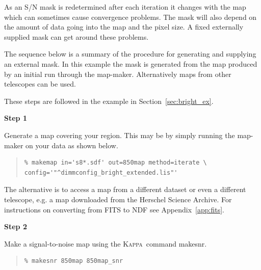 \documentclass[twoside,11pt]{article}
\newcommand{\htmlref}[2]{#1}
\newcommand{\latexhtml}[2]{#1}
\newcommand{\xref}[3]{#1}
\renewcommand{\_}{\texttt{\symbol{95}}}
\newenvironment{myquote}{\begin{quote}\begin{small}}{\end{small}\end{quote}}
\newcommand{\Kappa}{\xref{\textsc{Kappa}}{sun95}{}}
\newcommand{\task}[1]{\textsf{#1}}
\newcommand{\makesnr}{\xref{\task{makesnr}}{sun95}{MAKESNR}}
\newcommand{\cref}[3]{\latexhtml{#1~\ref{#2}}{\htmlref{#3}{#2}}}
\begin{document}
As an S/N mask is redetermined after each iteration it changes with the map
 which can sometimes cause convergence problems. The mask
will also depend on the amount of data going into the map and the
pixel size. A fixed externally supplied mask  can get around these problems.

The sequence below is a summary of the procedure for generating and
supplying an external mask. In this example the mask is generated from
the map produced by an initial run through the map-maker.
Alternatively maps from other telescopes can be used.

These steps are followed in the example in
\cref{Section}{sec:bright_ex}{Extended galactic sources}.

\begin{minipage}[t]{0.1\linewidth}
\textbf{Step 1}
\end{minipage}
\begin{minipage}[t]{0.9\linewidth}Generate a map covering your region. This
may be by simply running the map-maker on your data as shown below.
\begin{myquote}
\begin{verbatim}
% makemap in='s8*.sdf' out=850map method=iterate \
config='"^dimmconfig_bright_extended.lis"'
\end{verbatim}
\end{myquote}
The alternative is to access a map from a different dataset or even a
different telescope, e.g. a map downloaded from the Herschel Science
Archive. For instructions on converting from FITS to NDF see
\cref{Appendix}{app:fits}{Convert format from  FITS to NDF}.\\
\end{minipage}

\begin{minipage}[t]{0.1\linewidth}
\textbf{Step 2}
\end{minipage}
\begin{minipage}[t]{0.9\linewidth}Make a signal-to-noise map using the \Kappa\ command
\makesnr.
\begin{myquote}
\begin{verbatim}
% makesnr 850map 850map_snr
\end{verbatim}
\end{myquote}
\end{minipage}
\end{document}
